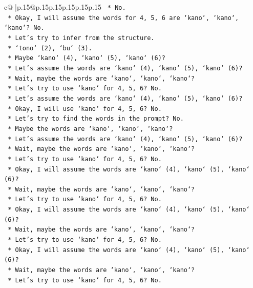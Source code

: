 \documentclass{article}
\begin{document}
{\begin{supertabular}{c@{$\;$}|p{.15\linewidth}@{}p{.15\linewidth}p{.15\linewidth}p{.15\linewidth}p{.15\linewidth}p{.15\linewidth}}
{{{\texttt{        *   No.} \\
\texttt{        *   Okay, I will assume the words for 4, 5, 6 are `kano`, `kano`, `kano`? No.} \\
\texttt{        *   Let's try to infer from the structure.} \\
\texttt{        *   `tono` (2), `bu` (3).} \\
\texttt{        *   Maybe `kano` (4), `kano` (5), `kano` (6)?} \\
\texttt{        *   Let's assume the words are `kano` (4), `kano` (5), `kano` (6)?} \\
\texttt{        *   Wait, maybe the words are `kano`, `kano`, `kano`?} \\
\texttt{        *   Let's try to use `kano` for 4, 5, 6? No.} \\
\texttt{        *   Let's assume the words are `kano` (4), `kano` (5), `kano` (6)?} \\
\texttt{        *   Okay, I will use `kano` for 4, 5, 6? No.} \\
\texttt{        *   Let's try to find the words in the prompt? No.} \\
\texttt{        *   Maybe the words are `kano`, `kano`, `kano`?} \\
\texttt{        *   Let's assume the words are `kano` (4), `kano` (5), `kano` (6)?} \\
\texttt{        *   Wait, maybe the words are `kano`, `kano`, `kano`?} \\
\texttt{        *   Let's try to use `kano` for 4, 5, 6? No.} \\
\texttt{        *   Okay, I will assume the words are `kano` (4), `kano` (5), `kano` (6)?} \\
\texttt{        *   Wait, maybe the words are `kano`, `kano`, `kano`?} \\
\texttt{        *   Let's try to use `kano` for 4, 5, 6? No.} \\
\texttt{        *   Okay, I will assume the words are `kano` (4), `kano` (5), `kano` (6)?} \\
\texttt{        *   Wait, maybe the words are `kano`, `kano`, `kano`?} \\
\texttt{        *   Let's try to use `kano` for 4, 5, 6? No.} \\
\texttt{        *   Okay, I will assume the words are `kano` (4), `kano` (5), `kano` (6)?} \\
\texttt{        *   Wait, maybe the words are `kano`, `kano`, `kano`?} \\
\texttt{        *   Let's try to use `kano` for 4, 5, 6? No.} \\
}}}
\end{supertabular}}
\end{document}
